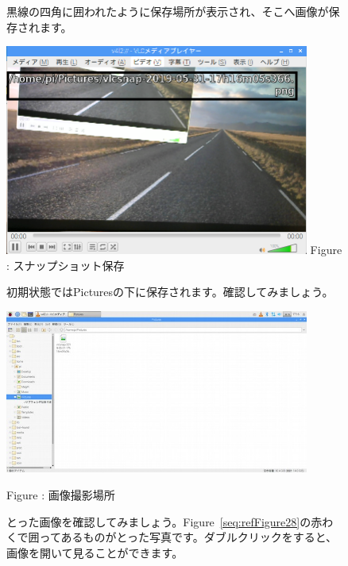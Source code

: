 \documentclass[a4paper,12pt]{jarticle}
\begin{document}
\clearpage
\begin{figure}
  黒線の四角に囲われたように保存場所が表示され、そこへ画像が保存されます。

  \centering
  \begin{minipage}{10cm}
    \includegraphics[width=10cm]{textbook-img120.png}
    Figure : スナップショット保存
  \end{minipage}



  \bigskip
  \flushleft

  初期状態ではPicturesの下に保存されます。確認してみましょう。



  \centering
  \begin{minipage}{10cm}
    \includegraphics[width=10cm]{textbook-img121.jpg}

    Figure : 画像撮影場所
  \end{minipage}


  \bigskip

  \flushleft
  とった画像を確認してみましょう。Figure~\ref{seq:refFigure28}の赤わくで囲ってあるものがとった写真です。ダブルクリックをすると、画像を開いて見ることができます。




\end{figure}
\end{document}
